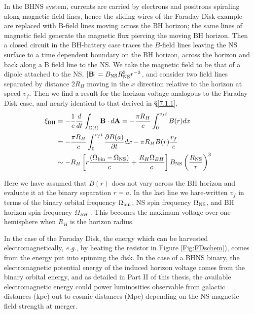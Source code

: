 In the BHNS system, currents are carried by electrons and positrons spiraling
along magnetic field lines, hence the sliding wires of the Faraday Disk
example are replaced with B-field lines moving across the BH horizon; the same
lines of magnetic field generate the magnetic flux piercing the moving BH
horizon. Then a closed circuit in the BH-battery case traces the $B$-field lines
leaving the NS surface to a time dependent boundary on the BH horizon, across
the horizon and back along a B field line to the NS. We take the magnetic field
to be that of a dipole attached to the NS, $|{\bf B}| = B_{\rm NS} R^3_{\rm NS}
r^{-3}$, and consider two field lines separated by distance $2R_H$ moving in the
$x$ direction relative to the horizon at speed $v_f$. Then we find a result
for the horizon voltage analogous to the Faraday Disk case, and nearly
identical to that derived in \S \ref{7.1.1},
\begin{align}
\xi_{\rm BH} &= - \frac{1}{c}\frac{d}{dt} \int_{\Sigma(t)}{{\bf B} \cdot d{\bf A}} =  - \frac{\pi R_H}{c} \int^{v_f t}_{0} {B(r) dx}  \\
&=  - \frac{\pi R_H}{c}  \int^{v_f t}_{0}{ \frac{\partial B(a)}{\partial t} dx}  - \pi R_H B(r) \frac{v_f}{c}    \\
& \sim    -R_H \left[r \frac{\left(\Omega_{\rm bin}  - \Omega_{\rm NS}\right)}{c} + \frac{R_H\Omega_{BH}}{c}\right] B_{\rm NS}  \left( \frac{R_{\rm NS}}{r} \right)^3
\end{align}

 Here we have assumed that $B(r)$ does not vary across the BH horizon and
evaluate it at the binary separation $r=a$. In the last line we hare-written
$v_f$ in terms of the binary orbital frequency $\Omega_{\rm bin}$, NS spin
frequency $\Omega_{\rm NS}$, and BH horizon spin frequency $\Omega_{BH}$
\citep[see][]{McL:2011}. This becomes the maximum voltage over one hemisphere
when $R_H$ is the horizon radius. 

In the case of the Faraday Disk, the energy which can be harvested
electromagnetically, \emph{e.g.}, by heating the resistor in Figure
\ref{Fig:FDschem}), comes from the energy put into spinning
the disk. In the case of a BHNS binary, the electromagnetic potential energy
of the induced horizon voltage comes from the binary orbital energy, and as
detailed in Part II of this thesis, the available electromagnetic energy could
power luminosities observable from galactic distances (kpc) out to cosmic
distances (Mpc) depending on the NS magnetic field strength at merger.


